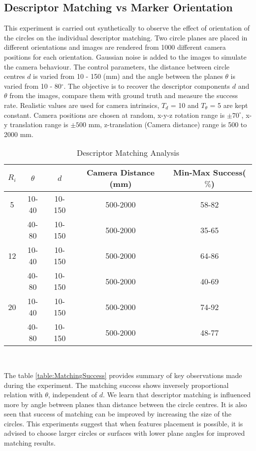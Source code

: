 \documentclass{bmvc2k}
\begin{document}
\subsection{Descriptor Matching vs Marker Orientation}
This experiment is carried out synthetically to observe the effect of orientation of the circles on the individual descriptor matching.
Two circle planes are placed in different orientations and images are rendered from 1000 different camera positions for each orientation. Gaussian noise is added to the images to simulate the camera behaviour. 
The control parameters, the distance between circle centres $ d $ is varied from 10 - 150 (mm) and the angle between the planes $ \theta $ is varied from 10 - 80$ ^\circ $. 
The objective is to recover the descriptor components $ d $ and $ \theta $ from the images, compare them with ground truth and measure the success rate. 
Realistic values are used for camera intrinsics, $ T_{d} $ = 10 and $ T_\theta $ = 5 are kept constant. 
Camera positions are chosen at random, x-y-z rotation range is $ \pm 70^\circ $, x-y translation range is $ \pm 500 $ mm, z-translation (Camera distance) range is 500 to 2000 mm. 

\begin{table}
\centering
\caption{Descriptor Matching Analysis } \label{table:MatchingSuccess}
\begin{tabular}{|c | c | c | c | c |}
\hline
$ R_i $ & $ \theta $ & $ d $ & Camera Distance (mm) & Min-Max Success($ \% $) \\ \hline
5 & 10-40 & 10-150 & 500-2000 & 58-82 \\
 {}& 40-80 & 10-150 & 500-2000 & 35-65 \\ \hline
12 & 10-40 & 10-150 & 500-2000 & 64-86 \\
{}& 40-80 & 10-150& 500-2000 & 40-69 \\ \hline
 20 & 10-40 & 10-150 & 500-2000 & 74-92 \\
{} & 40-80 & 10-150 & 500-2000  & 48-77 \\ \hline 
\end{tabular} \\
\label{tab:Exp1}
\end{table}
The table \ref{table:MatchingSuccess} provides summary of key observations made during the experiment. 
The matching success shows inversely proportional relation with $ \theta $, independent of $ d $. 
We learn that descriptor matching is influenced more by angle between planes than distance between the circle centres. 
It is also seen that success of matching can be improved by increasing the size of the circles. 
This experiments suggest that when features placement is possible, it is advised to choose larger circles or surfaces with lower plane angles for improved matching results. 
\end{document}
